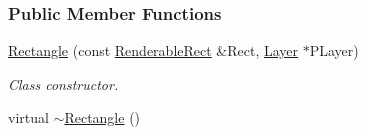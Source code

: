 \subsubsection*{Public Member Functions}
\begin{DoxyCompactItemize}
\item 
\hyperlink{classMezzanine_1_1UI_1_1Rectangle_a2048370186db33f608584c9a33de71a1}{Rectangle} (const \hyperlink{structMezzanine_1_1UI_1_1RenderableRect}{RenderableRect} \&Rect, \hyperlink{classMezzanine_1_1UI_1_1Layer}{Layer} $\ast$PLayer)
\begin{DoxyCompactList}\small\item\em Class constructor. \item\end{DoxyCompactList}\item 
\hypertarget{classMezzanine_1_1UI_1_1Rectangle_a1c2a466100f36a45c7ed2f85f0a9e269}{
virtual \hyperlink{classMezzanine_1_1UI_1_1Rectangle_a1c2a466100f36a45c7ed2f85f0a9e269}{$\sim$Rectangle} ()}
\label{classMezzanine_1_1UI_1_1Rectangle_a1c2a466100f36a45c7ed2f85f0a9e269}


\end{DoxyCompactItemize}
